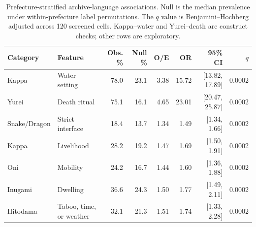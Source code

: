 \begin{table}[t]
\centering
\footnotesize
\setlength{\tabcolsep}{3pt}
\begin{tabular}{llrrrrrr}
\toprule
Category & Feature & Obs. \% & Null \% & O/E & OR & 95\% CI & $q$ \\
\midrule
Kappa & Water setting & 78.0 & 23.1 & 3.38 & 15.72 & [13.82, 17.89] & 0.0002 \\
Yurei & Death ritual & 75.1 & 16.1 & 4.65 & 23.01 & [20.47, 25.87] & 0.0002 \\
Snake/Dragon & Strict interface & 18.4 & 13.7 & 1.34 & 1.49 & [1.34, 1.66] & 0.0002 \\
Kappa & Livelihood & 28.2 & 19.2 & 1.47 & 1.69 & [1.50, 1.91] & 0.0002 \\
Oni & Mobility & 24.2 & 16.7 & 1.44 & 1.60 & [1.36, 1.88] & 0.0002 \\
Inugami & Dwelling & 36.6 & 24.3 & 1.50 & 1.77 & [1.49, 2.11] & 0.0002 \\
Hitodama & Taboo, time, or weather & 32.1 & 21.3 & 1.51 & 1.74 & [1.33, 2.28] & 0.0002 \\
\bottomrule
\end{tabular}
\caption{Prefecture-stratified archive-language associations. Null is the median prevalence under \PermutationCount{} within-prefecture label permutations. The $q$ value is Benjamini--Hochberg adjusted across 120 screened cells. Kappa--water and Yurei--death are construct checks; other rows are exploratory.}
\label{tab:associations}
\end{table}
